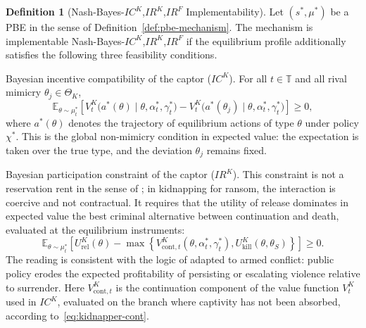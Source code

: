 \documentclass[review,authoryear,12pt]{elsarticle}
\providecommand{\textcite}{\citet}
\theoremstyle{plain}
\theoremstyle{definition}
\newtheorem{definition}[theorem]{Definition}
\newcommand{\ThetaK}{\Theta_K}
\newcommand{\1}{\mathbf{1}}
\begin{document}
\begin{definition}[Nash-Bayes-$IC^K$,$IR^K$,$IR^F$ Implementability]
\label{def:implementable-mechanism}
Let $(s^\ast,\mu^\ast)$ be a PBE in the sense of Definition~\ref{def:pbe-mechanism}. The mechanism is implementable Nash-Bayes-$IC^K$,$IR^K$,$IR^F$ if the equilibrium profile additionally satisfies the following three feasibility conditions.

\smallskip
\noindent Bayesian incentive compatibility of the captor \textup{(}$IC^K$\textup{)}. For all $t\in\mathbb{T}$ and all rival mimicry $\theta_j\in\ThetaK$,
\[
\mathbb{E}_{\theta\sim\mu_t^\ast}
\left[
V^K_t\!\bigl(a^\ast(\theta)\mid \theta,\alpha_t^\ast,\gamma_t^\ast\bigr)
-
V^K_t\!\bigl(a^\ast(\theta_j)\mid \theta,\alpha_t^\ast,\gamma_t^\ast\bigr)
\right]
\ge 0,
\]
where $a^\ast(\theta)$ denotes the trajectory of equilibrium actions of type $\theta$ under policy $\chi^\ast$. This is the global non-mimicry condition in expected value: the expectation is taken over the true type, and the deviation $\theta_j$ remains fixed.

\smallskip
\noindent Bayesian participation constraint of the captor \textup{(}$IR^K$\textup{)}. This constraint is not a reservation rent in the sense of \textcite{Myerson1979IC}; in kidnapping for ransom, the interaction is coercive and not contractual. It requires that the utility of release dominates in expected value the best criminal alternative between continuation and death, evaluated at the equilibrium instruments:
\[
\mathbb{E}_{\theta\sim\mu_t^\ast}
\left[
U^K_{\mathrm{rel}}(\theta)
-
\max\left\{
V^K_{\mathrm{cont},t}(\theta,\alpha_t^\ast,\gamma_t^\ast),
U^K_{\mathrm{kill}}(\theta,\theta_S)
\right\}
\right]
\ge0.
\]
The reading is consistent with the logic of \textcite{Becker1968} adapted to armed conflict: public policy erodes the expected profitability of persisting or escalating violence relative to surrender. Here $V^K_{\mathrm{cont},t}$ is the continuation component of the value function $V^K_t$ used in $IC^K$, evaluated on the branch where captivity has not been absorbed, according to~\eqref{eq:kidnapper-cont}.


\end{definition}
\end{document}
